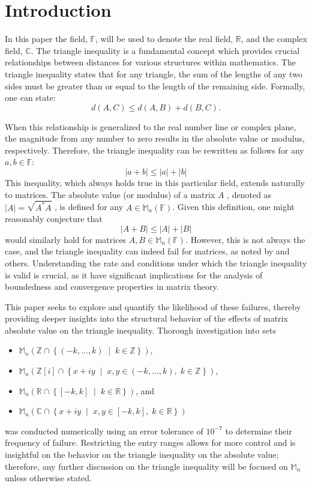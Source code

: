 \section{Introduction}
In this paper the field, \(\mathbb{F}\), will be used to denote the real field, \(\mathbb{R}\), and the complex field, \(\mathbb{C}\).
The triangle inequality is a fundamental concept which provides crucial relationships between distances for various structures within mathematics. 
The triangle inequality states that for any triangle, the sum of the lengths of any two sides must be greater than or equal to the length of the remaining side. 
Formally, one can state:
\[
d(A, C) \leq d(A, B) + d(B, C).
\]


When this relationship is generalized to the real number line or complex plane, the magnitude from any number to zero results in the absolute value or modulus, respectively.
Therefore, the triangle inequality can be rewritten as follows for any $a,b \in \mathbb{F}$:
\[|a + b| \leq |a| + |b|
\]
This inequality, which always holds true in this particular field, extends naturally to matrices. The absolute value (or modulus) of a matrix  $A$ , 
denoted as  $|A| = \sqrt{A^*A}$ , is defined for any $ A \in \mathbb{M}_n(\mathbb{F})$. Given this definition, one might reasonably conjecture that
\[
|A + B| \leq |A| + |B|
\]
would similarly hold for matrices  \(A, B \in \mathbb{M}_n(\mathbb{F}).\) However, this is not always the case, and the triangle inequality can indeed fail for matrices, as noted by \cite{BK} and others.
Understanding the rate and conditions under which the triangle inequality is valid is crucial, as it have significant implications for the analysis of boundedness and convergence properties in matrix theory. 
\par This paper seeks to explore and quantify the likelihood of these failures, thereby providing deeper insights into the structural behavior of the effects of matrix absolute value on the triangle
inequality. 
Thorough investigation into sets
\begin{itemize}
    \item \(\mathbb{M}_n\left(\mathbb{Z} \cap \left\{ (-k, \ldots, k) \;\middle|\; k \in \mathbb{Z} \right\}\right)\),
    \item \(\mathbb{M}_n\left(\mathbb{Z}[i] \cap \left\{ x + i y \;\middle|\; x, y \in (-k, \ldots, k), \; k \in \mathbb{Z} \right\}\right)\),
    \item \(\mathbb{M}_n\left(\mathbb{R} \cap \left\{ [-k, k] \;\middle|\; k \in \mathbb{R} \right\}\right)\), and
    \item \(\mathbb{M}_n\left(\mathbb{C} \cap \left\{ x + i y \;\middle|\; x, y \in [-k, k], \; k \in \mathbb{R} \right\}\right)\)
\end{itemize}
 was conducted numerically using an error tolerance of \(10^{-7} \) to determine their frequency of failure.
Restricting the entry ranges allows for more control and is insightful on the behavior on the triangle inequality on the absolute value; therefore, any further discussion on the triangle
inequality will be focused on \(\mathbb{M}_n\) unless otherwise stated.